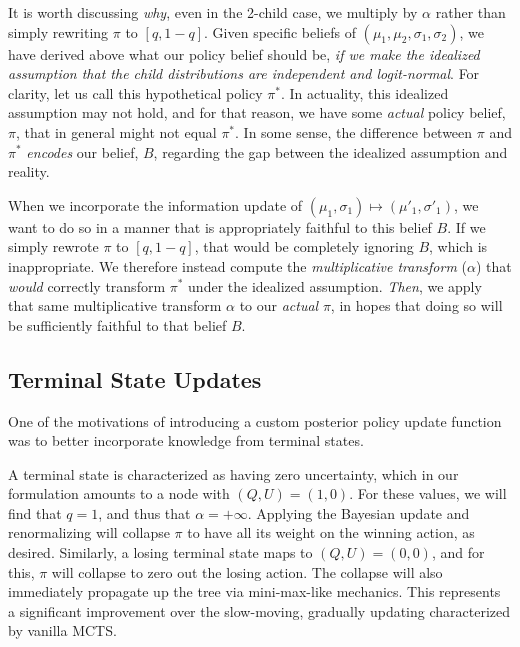 \documentclass[tikz]{article}
\begin{document}
It is worth discussing \emph{why}, even in the 2-child case, we multiply by $\alpha$ rather than simply rewriting $\pi$ to $[q, 1-q]$.
Given specific beliefs of $(\mu_1, \mu_2, \sigma_1, \sigma_2)$, we have derived above what our policy belief should be, \textit{if we make
the idealized assumption that the child distributions are independent and logit-normal}. For clarity, let us call this hypothetical policy $\pi^*$.
In actuality, this idealized assumption may not hold, and for that reason, we have some \textit{actual} policy belief, $\pi$, that in general might not
equal $\pi^*$. In some sense, the difference between $\pi$ and $\pi^*$ \emph{encodes} our belief, $B$, regarding the gap between
the idealized assumption and reality. \newline

When we incorporate the information update of $(\mu_1, \sigma_1) \mapsto (\mu'_1, \sigma'_1)$, we want to do so in
a manner that is appropriately faithful to this belief $B$. If we simply rewrote $\pi$ to $[q, 1-q]$, that would be completely
ignoring $B$, which is inappropriate. We therefore instead compute the \textit{multiplicative transform} ($\alpha$)
that \textit{would} correctly transform $\pi^*$ under the idealized assumption. \textit{Then}, we apply that same
multiplicative transform $\alpha$ to our \textit{actual} $\pi$, in hopes that doing so will be sufficiently faithful to that
belief $B$.

\subsection{Terminal State Updates}

One of the motivations of introducing a custom posterior policy update function was to better incorporate knowledge from terminal states. \newline

A terminal state is characterized as having zero uncertainty, which in our formulation amounts to a node with $(Q, U) = (1, 0)$. For
these values, we will find that $q=1$, and thus that $\alpha = +\infty$. Applying the Bayesian update and
renormalizing will collapse $\pi$ to have all its weight on the winning action, as desired. Similarly, a losing terminal state maps
to $(Q, U) = (0, 0)$, and for this, $\pi$ will collapse to zero out the losing action. The collapse will also immediately propagate up the tree via
mini-max-like mechanics. This represents a significant improvement over the slow-moving, gradually updating characterized by vanilla MCTS. \newline
\end{document}
